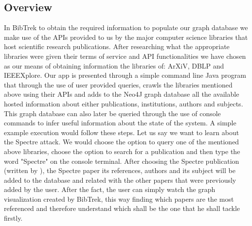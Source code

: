\documentclass[twocolumn]{article}
\begin{document}
\subsection{Overview}
In BibTrek to obtain the required information to populate our graph database we make use of the APIs provided to us by the major computer science libraries that host scientific research publications. After researching what the appropriate libraries were given their terms of service and API functionalities we have chosen as our means of obtaining information the libraries of: ArXiV, DBLP and IEEEXplore. Our app is presented through a simple command line Java program that through the use of user provided queries, crawls the libraries mentioned above using their APIs and adds to the Neo4J graph database all the available hosted information about either publications, institutions, authors and subjects. This graph database can also later be queried through the use of console commands to infer useful information about the state of the system. A simple example execution would follow these steps. Let us say we want to learn about the Spectre attack. We would choose the option to query one of the mentioned above libraries, choose the option to search for a publication and then type the word "Spectre" on the console terminal. After choosing the Spectre publication (written by ), the Spectre paper its references, authors and its subject will be added to the database and related with the other papers that were previously added by the user. After the fact, the user can simply watch the graph visualization created by BibTrek, this way finding which papers are the most referenced and therefore understand which shall be the one that he shall tackle firstly.
\end{document}
